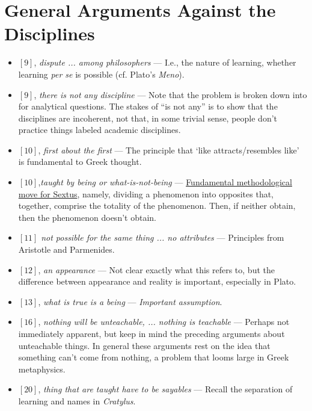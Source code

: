 \documentclass[12pt]{article}
\begin{document}
\section{General Arguments Against the Disciplines}

\begin{itemize}

\item $[9]$, \textit{dispute ... among philosophers} --- I.e., the nature of learning, whether learning \textit{per se} is possible (cf. Plato's \textit{Meno}).

\item $[9]$, \textit{there is not any discipline} --- Note that the problem is broken down into for analytical questions. The stakes of ``is not any'' is to show that the disciplines are incoherent, not that, in some trivial sense, people don't practice things labeled academic disciplines.

\item $[10]$, \textit{first about the first} --- The principle that `like attracts/resembles like' is fundamental to Greek thought.

\item $[10]$,\textit{taught by being or what-is-not-being} --- \ul{Fundamental methodological move for Sextus}, namely, dividing a phenomenon into opposites that, together, comprise the totality of the phenomenon. Then, if neither obtain, then the phenomenon doesn't obtain.

\item $[11]$ \textit{not possible for the same thing ... no attributes} --- Principles from Aristotle and Parmenides.

\item $[12]$, \textit{an appearance} --- Not clear exactly what this refers to, but the difference between appearance and reality is important, especially in Plato.

\item $[13]$, \textit{what is true is a being} --- \textit{Important assumption}.

\item $[16]$, \textit{nothing will be unteachable, ... nothing is teachable} --- Perhaps not immediately apparent, but keep in mind the preceding arguments about unteachable things. In general these arguments rest on the idea that something can't come from nothing, a problem that looms large in Greek metaphysics.

\item $[20]$, \textit{thing that are taught have to be sayables} --- Recall the separation of learning and names in \textit{Cratylus}.


\end{itemize}
\end{document}
